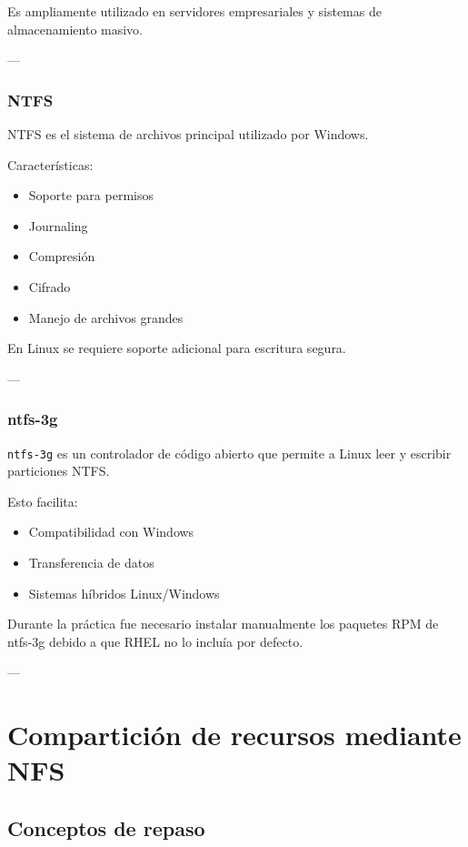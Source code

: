 \documentclass[11pt, letterpaper]{article}
\begin{document}
Es ampliamente utilizado en servidores empresariales y sistemas de almacenamiento masivo.

---
\subsubsection{NTFS}
\label{sec:orgc475080}

NTFS es el sistema de archivos principal utilizado por Windows.

Características:

\begin{itemize}
\item Soporte para permisos
\item Journaling
\item Compresión
\item Cifrado
\item Manejo de archivos grandes
\end{itemize}

En Linux se requiere soporte adicional para escritura segura.

---
\subsubsection{ntfs-3g}
\label{sec:org21b3a89}

\texttt{ntfs-3g} es un controlador de código abierto que permite a Linux leer y escribir particiones NTFS.

Esto facilita:

\begin{itemize}
\item Compatibilidad con Windows
\item Transferencia de datos
\item Sistemas híbridos Linux/Windows
\end{itemize}

Durante la práctica fue necesario instalar manualmente los paquetes RPM de ntfs-3g debido a que RHEL no lo incluía por defecto.

---
\section{Compartición de recursos mediante NFS}
\label{sec:orgb223cbe}

\subsection{Conceptos de repaso}
\label{sec:org3f08d32}
\end{document}
